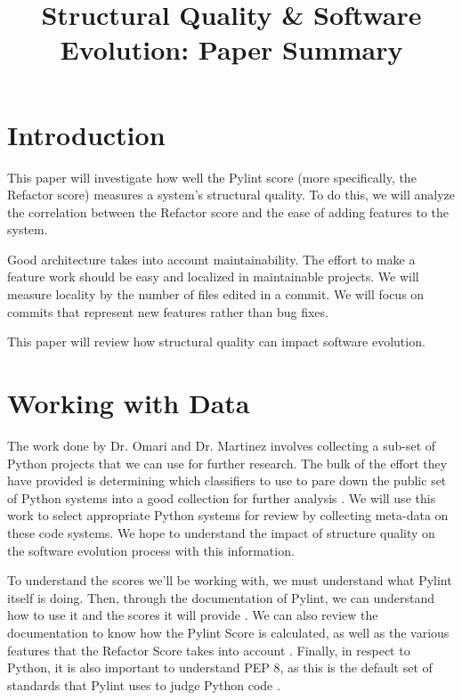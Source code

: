 \documentclass[12pt,conference]{IEEEtran}
\begin{document}
\title{Structural Quality \& Software Evolution: \newline Paper Summary}

\author{
}

\maketitle

\section{Introduction}
This paper will investigate how well the Pylint score (more specifically, the Refactor score) measures a system's structural quality. To do this, we will analyze the correlation between the Refactor score and the ease of adding features to the system.

Good architecture takes into account maintainability. The effort to make a feature work should be easy and localized in maintainable projects. We will measure locality by the number of files edited in a commit. We will focus on commits that represent new features rather than bug fixes.

This paper will review how structural quality can impact software evolution.

\section{Working with Data}

The work done by Dr. Omari and Dr. Martinez involves collecting a sub-set of Python projects that we can use for further research. The bulk of the effort they have provided is determining which classifiers to use to pare down the public set of Python systems into a good collection for further analysis \cite{omari:2018}. We will use this work to select appropriate Python systems for review by collecting meta-data on these code systems. We hope to understand the impact of structure quality on the software evolution process with this information.

To understand the scores we'll be working with, we must understand what Pylint itself is doing. Then, through the documentation of Pylint, we can understand how to use it and the scores it will provide \cite{pylint:main}. We can also review the documentation to know how the Pylint Score is calculated, as well as the various features that the Refactor Score takes into account \cite{pylint:score}. Finally, in respect to Python, it is also important to understand PEP 8, as this is the default set of standards that Pylint uses to judge Python code \cite{pylint:pep8}.
\end{document}
